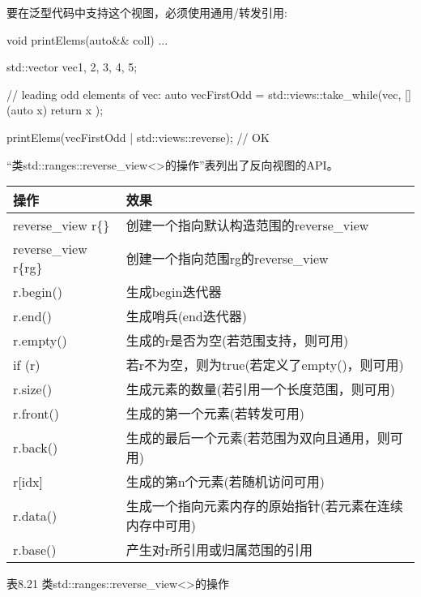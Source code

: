 要在泛型代码中支持这个视图，必须使用通用/转发引用:

\begin{cpp}
void printElems(auto&& coll) {
	...
}

std::vector vec{1, 2, 3, 4, 5};

// leading odd elements of vec:
auto vecFirstOdd = std::views::take_while(vec, [](auto x) {
							return x %
						});

printElems(vecFirstOdd | std::views::reverse); // OK
\end{cpp}



“类std::ranges::reverse\_view<>的操作”表列出了反向视图的API。

\begin{longtable}[c]{|l|l|}
\hline
\textbf{操作}    & \textbf{效果}                                                \\ \hline
\endfirsthead
%
\endhead
%
reverse\_view r\{\} & 创建一个指向默认构造范围的reverse\_view                                 \\ \hline
reverse\_view r\{rg\} & 创建一个指向范围rg的reverse\_view                \\ \hline
r.begin()             & 生成begin迭代器                                      \\ \hline
r.end()               & 生成哨兵(end迭代器)                             \\ \hline
r.empty()             & 生成的r是否为空(若范围支持，则可用) \\ \hline
if (r)                & 若r不为空，则为true(若定义了empty()，则可用)       \\ \hline
r.size()            & 生成元素的数量(若引用一个长度范围，则可用)                              \\ \hline
r.front()             & 生成的第一个元素(若转发可用)              \\ \hline
r.back()              & 生成的最后一个元素(若范围为双向且通用，则可用) \\ \hline
r{[}idx{]}            & 生成的第n个元素(若随机访问可用)            \\ \hline
r.data()            & 生成一个指向元素内存的原始指针(若元素在连续内存中可用) \\ \hline
r.base()              & 产生对r所引用或归属范围的引用       \\ \hline
\end{longtable}

\begin{center}
表8.21 类std::ranges::reverse\_view<>的操作
\end{center}

